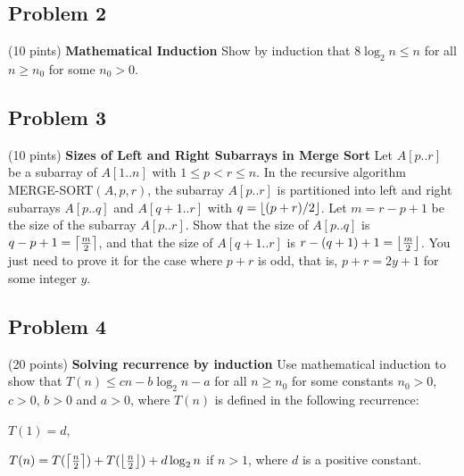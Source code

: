 \documentclass[12pt]{article}
\DeclarePairedDelimiter{\ceil}{\lceil}{\rceil}
\DeclarePairedDelimiter{\floor}{\lfloor}{\rfloor}
\begin{document}
\subsection*{Problem 2} (10 pints) {\bf Mathematical Induction} 
Show by induction that $8 \log_2 n \leq n$ for all $n \geq n_0$ for some $n_0  > 0$.

\subsection*{Problem 3} (10 pints) {\bf Sizes of Left and Right Subarrays in Merge Sort}
Let $A[p .. r]$ be a subarray of $A[1 .. n]$ with $1 \leq p < r \leq n$. In the recursive algorithm MERGE-SORT$(A, p , r)$, the subarray $A[p .. r]$ is partitioned into left and right subarrays $A[p .. q]$ and $A[q+1 .. r]$ with $q = \floor*{(p+r)/2}$. Let $m = r - p + 1$ be the size of the subarray $A[p .. r]$. Show that the size of $A[p .. q]$ is $q- p + 1 = \ceil*{\frac{m}{2}}$, and that the size of $A[q+1 .. r]$ is $r - (q+1) + 1 = \floor*{\frac{m}{2}}$. You just need to prove it for the case where $p+r$ is odd, that is, $p + r = 2 y + 1$ for some integer $y$.

\subsection*{Problem 4} (20 points) {\bf Solving recurrence by induction} 
Use mathematical induction to show that $T(n) \leq c n - b \log_2 n - a$ for all $n \geq n_0$ for some constants $n_0 > 0$, $c > 0$, $b > 0$ and $a > 0$, where $T(n)$ is defined in the following recurrence:

$T(1) = d$,

$T(n) = T( \ceil*{\frac{n}{2}} ) + T( \floor*{\frac{n}{2}} ) + d \log_2 n$ if $n > 1$, where $d$ is a positive constant.
\end{document}
